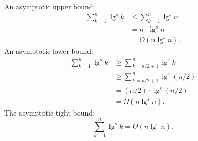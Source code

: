 An asymptotic upper bound:
\begin{align*}
    \sum_{k=1}^n\lg^sk &\le \sum_{k=1}^n\lg^sn \\
    &= n\cdot\lg^sn \\
    &= O(n\lg^sn).
\end{align*}
An asymptotic lower bound:
\begin{align*}
    \sum_{k=1}^n\lg^sk &\ge \sum_{k=n/2+1}^n\lg^sk \\
    &\ge \sum_{k=n/2+1}^n\lg^s(n/2) \\
    &= (n/2)\cdot\lg^s(n/2) \\
    &= \Omega(n\lg^sn).
\end{align*}
The asymptotic tight bound:
\[
    \sum_{k=1}^n\lg^sk = \Theta(n\lg^sn).
\]
